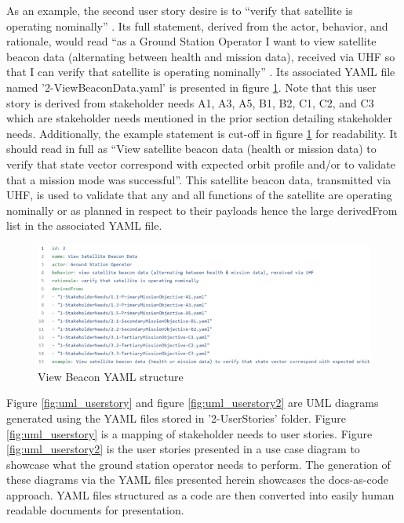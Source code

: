 \documentclass[journal,article,submit,pdftex,moreauthors]{Definitions/mdpi}
\begin{document}
As an example, the second user story desire is to “verify that satellite is operating nominally” \cite{sealion_mission_architecture}.  Its full statement, derived from the actor, behavior, and rationale, would read “as a Ground Station Operator I want to view satellite beacon data (alternating between health and mission data), received via UHF so that I can verify that satellite is operating nominally” \cite{sealion_page}.  Its associated YAML file named '2-ViewBeaconData.yaml' is presented in figure \ref{fig:view_beacon}.  Note that this user story is derived from stakeholder needs A1, A3, A5, B1, B2, C1, C2, and C3 which are stakeholder needs mentioned in the prior section detailing stakeholder needs.  Additionally, the example statement is cut-off in figure \ref{fig:view_beacon} for readability.  It should read in full as “View satellite beacon data (health or mission data) to verify that state vector correspond with expected orbit profile and/or to validate that a mission mode was successful”.  This satellite beacon data, transmitted via UHF, is used to validate that any and all functions of the satellite are operating nominally or as planned in respect to their payloads hence the large derivedFrom list in the associated YAML file.

\begin{figure}[H]
    \includegraphics[width=10.5 cm]{assets/view_beacon.png}
    \caption{View Beacon YAML structure}
	\label{fig:view_beacon}
    \end{figure}
	\noindent   
\unskip

Figure \ref{fig:uml_userstory} and figure \ref{fig:uml_userstory2} are UML diagrams generated using the YAML files stored in '2-UserStories' folder.  Figure \ref{fig:uml_userstory} is a mapping of stakeholder needs to user stories.  Figure \ref{fig:uml_userstory2} is the user stories presented in a use case diagram to showcase what the ground station operator needs to perform.  The generation of these diagrams via the YAML files presented herein showcases the docs-as-code approach.  YAML files structured as a code are then converted into easily human readable documents for presentation.
\end{document}
